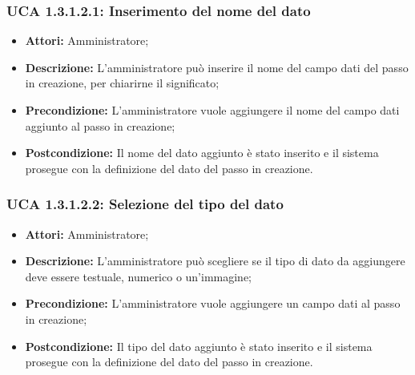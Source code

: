 \hypertarget{A1.3.1.2.1}{}
\subsubsection{UCA 1.3.1.2.1: Inserimento del nome del dato}
\begin{itemize}
\item \textbf{Attori:}
Amministratore;
\item \textbf{Descrizione:}
L'amministratore può inserire il nome del campo dati del passo in creazione, per chiarirne il significato;
\item \textbf{Precondizione:}
L'amministratore vuole aggiungere il nome del campo dati aggiunto al passo in creazione;
\item \textbf{Postcondizione:}
Il nome del dato aggiunto è stato inserito e il sistema prosegue con la definizione del dato del passo in creazione.
\end{itemize}

\hypertarget{A1.3.1.2.2}{}
\subsubsection{UCA 1.3.1.2.2: Selezione del tipo del dato}
\begin{itemize}
\item \textbf{Attori:}
Amministratore;
\item \textbf{Descrizione:}
L'amministratore può scegliere se il tipo di dato da aggiungere deve essere testuale, numerico o un'immagine;
\item \textbf{Precondizione:}
L'amministratore vuole aggiungere un campo dati al passo in creazione;
\item \textbf{Postcondizione:}
Il tipo del dato aggiunto è stato inserito e il sistema prosegue con la definizione del dato del passo in creazione.
\end{itemize}

\hypertarget{A1.3.1.3}{}
